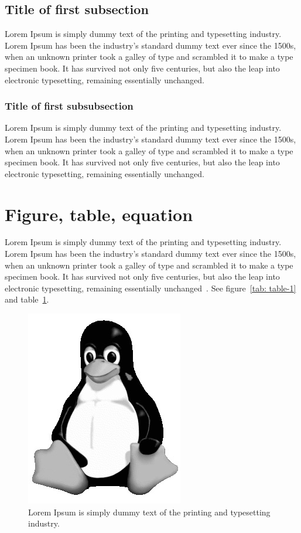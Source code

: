 \documentclass[conference]{IEEEtran}
\begin{document}
\subsection{Title of first subsection}
Lorem Ipsum is simply dummy text of the printing and typesetting industry. Lorem Ipsum has been the industry's standard dummy text ever since the 1500s, when an unknown printer took a galley of type and scrambled it to make a type specimen book. It has survived not only five centuries, but also the leap into electronic typesetting, remaining essentially unchanged.

\subsubsection{Title of first subsubsection}
Lorem Ipsum is simply dummy text of the printing and typesetting industry. Lorem Ipsum has been the industry's standard dummy text ever since the 1500s, when an unknown printer took a galley of type and scrambled it to make a type specimen book. It has survived not only five centuries, but also the leap into electronic typesetting, remaining essentially unchanged.

\section{Figure, table, equation}
Lorem Ipsum is simply dummy text of the printing and typesetting industry. Lorem Ipsum has been the industry's standard dummy text ever since the 1500s, when an unknown printer took a galley of type and scrambled it to make a type specimen book. It has survived not only five centuries, but also the leap into electronic typesetting, remaining essentially unchanged~\cite{Magnetism}. See figure~\ref{tab: table-1} and table~\ref{fig:logo}.

\begin{figure}[tbp]
	\centering
	\includegraphics[width=0.35\linewidth]{gfx}
	\caption{Lorem Ipsum is simply dummy text of the printing and typesetting industry.}
	\label{fig:logo}
\end{figure}
\end{document}
